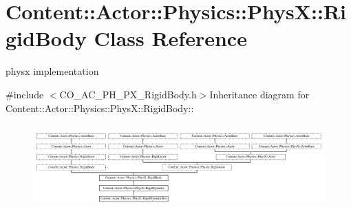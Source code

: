 \hypertarget{classContent_1_1Actor_1_1Physics_1_1PhysX_1_1RigidBody}{
\section{Content::Actor::Physics::PhysX::RigidBody Class Reference}
\label{classContent_1_1Actor_1_1Physics_1_1PhysX_1_1RigidBody}
}


physx implementation  


{\ttfamily \#include $<$CO\_\-AC\_\-PH\_\-PX\_\-RigidBody.h$>$}Inheritance diagram for Content::Actor::Physics::PhysX::RigidBody::\begin{figure}[H]
\begin{center}
\leavevmode
\includegraphics[height=3.29966cm]{classContent_1_1Actor_1_1Physics_1_1PhysX_1_1RigidBody}
\end{center}
\end{figure}
